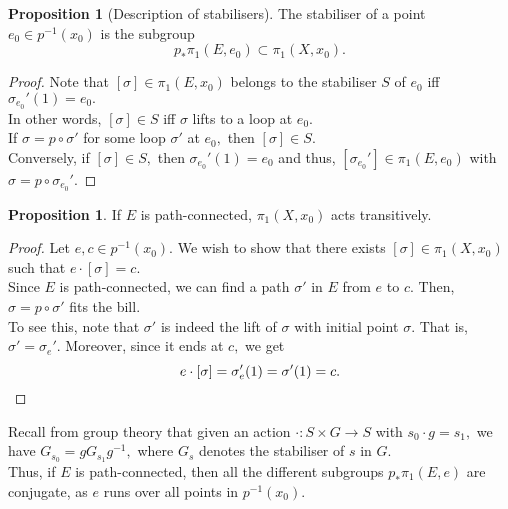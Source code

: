 \documentclass[12pt]{article}
\theoremstyle{definition}
\numberwithin{thm}{section}
\newtheorem{prop}[thm]{Proposition}
\begin{document}
\begin{prop}[Description of stabilisers]
	The stabiliser of a point $e_0 \in p^{-1}(x_0)$ is the subgroup 
	\begin{equation*} 
		p_*\pi_1(E, e_0) \subset \pi_1(X, x_0).
	\end{equation*}
\end{prop}
\begin{proof} 
	Note that $[\sigma] \in \pi_1(E, x_0)$ belongs to the stabiliser $S$ of $e_0$ iff $\sigma_{e_0}'(1) = e_0.$\\
	In other words, $[\sigma] \in S$ iff $\sigma$ lifts to a loop at $e_0.$\\
	If $\sigma = p \circ \sigma'$ for some loop $\sigma'$ at $e_0,$ then $[\sigma] \in S.$\\
	Conversely, if $[\sigma] \in S,$ then $\sigma_{e_0}'(1) = e_0$ and thus, $[\sigma_{e_0}'] \in \pi_1(E, e_0)$ with $\sigma = p \circ \sigma_{e_0}'.$
\end{proof}

\begin{prop}
	If $E$ is path-connected, $\pi_1(X, x_0)$ acts transitively.
\end{prop}
\begin{proof} 
	Let $e, c \in p^{-1}(x_0).$ We wish to show that there exists $[\sigma] \in \pi_1(X, x_0)$ such that $e\cdot[\sigma] = c.$\\
	Since $E$ is path-connected, we can find a path $\sigma'$ in $E$ from $e$ to $c.$ Then, $\sigma = p \circ \sigma'$ fits the bill.\\
	To see this, note that $\sigma'$ is indeed the lift of $\sigma$ with initial point $\sigma.$ That is, $\sigma' = \sigma_e'.$ Moreover, since it ends at $c,$ we get
	\begin{equation*} 
		e\cdot[\sigma] = \sigma_e'(1) = \sigma'(1) = c. \qedhere
	\end{equation*}
\end{proof}

Recall from group theory that given an action $\cdot:S \times G \to S$ with $s_0\cdot g = s_1,$ we have $G_{s_0} = gG_{s_1}g^{-1},$ where $G_s$ denotes the stabiliser of $s$ in $G.$\\
Thus, if $E$ is path-connected, then all the different subgroups $p_*\pi_1(E, e)$ are conjugate, as $e$ runs over all points in $p^{-1}(x_0).$
\end{document}
